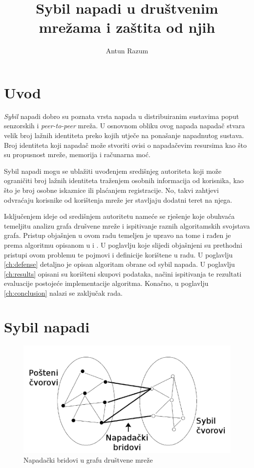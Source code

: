 \documentclass[times, utf8, seminar, numeric]{fer}
\begin{document}
\title{Sybil napadi u društvenim mrežama i zaštita od njih}
\author{Antun Razum}

\maketitle

\tableofcontents

\chapter{Uvod}
\textit{Sybil} napadi  dobro su poznata vrsta napada u distribuiranim sustavima poput senzorskih i \textit{peer-to-peer} mreža. U osnovnom obliku ovog napada napadač stvara velik broj lažnih identiteta preko kojih utječe na ponašanje napadnutog sustava. Broj identiteta koji napadač može stvoriti ovisi o napadačevim resursima kao što su propusnost mreže, memorija i računarna moć.

Sybil napadi mogu se ublažiti uvođenjem središnjeg autoriteta koji može ograničiti broj lažnih identiteta traženjem osobnih informacija od korisnika, kao što je broj osobne iskaznice ili plaćanjem registracije. No, takvi zahtjevi odvraćaju korisnike od korištenja mreže jer stavljaju dodatni teret na njega.

Isključenjem ideje od središnjem autoritetu nameće se rješenje koje obuhvaća temeljitu analizu grafa drušvene mreže i ispitivanje raznih algoritamskih svojstava grafa. Pristup objašnjen u ovom radu temeljen je upravo na tome i rađen je prema algoritmu opisanom u \cite{sybil-defender-old} i \cite{sybil-defender}. U poglavlju koje slijedi objašnjeni su prethodni pristupi ovom problemu te pojmovi i definicije korištene u radu. U poglavlju \ref{ch:defense} detaljno je opisan algoritam obrane od sybil napada. U poglavlju \ref{ch:results} opisani su korišteni skupovi podataka, načini ispitivanja te rezultati evaluacije postojeće implementacije algoritma. Konačno, u poglavlju \ref{ch:conclusion} nalazi se zaključak rada.

\chapter{Sybil napadi} \label{ch:sybil}
\begin{figure}[h]
	\centering
	\includegraphics[scale=0.3]{attack.png}
	\caption{Napadački bridovi u grafu društvene mreže}
	\label{fig:attack}
\end{figure}
\end{document}
